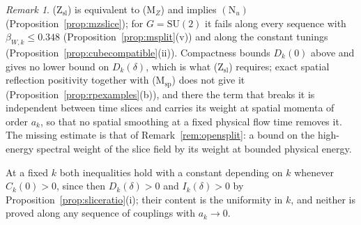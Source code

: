 \documentclass[aps,prd,twocolumn,superscriptaddress,nofootinbib,longbibliography,floatfix,amsmath,amssymb,10pt]{revtex4-2}
\theoremstyle{definition}
\theoremstyle{remark}
\newtheorem{remark}[theorem]{Remark}
\newcommand{\SU}{\mathrm{SU}}
\begin{document}
\begin{remark}
(Z$_{\mathrm{sl}}$) is equivalent to (M$_Z$) and implies $(\mathrm N_u)$
(Proposition~\ref{prop:mzslice}); for $G=\SU(2)$ it fails along every
sequence with $\beta_{W,k}\le0.348$ (Proposition~\ref{prop:msplit}(v)) and
along the constant tunings (Proposition~\ref{prop:cubecompatible}(ii)). Compactness bounds $D_k(0)$ above and gives no
lower bound on $D_k(\delta)$, which is what (Z$_{\mathrm{sl}}$) requires;
exact spatial reflection positivity together with (M$_{\mathrm{sp}}$) does
not give it (Proposition~\ref{prop:rpexamples}(b)), and there the term
that breaks it is independent between time slices and carries its weight at spatial momenta of order $a_k$, so that no spatial smoothing at a fixed physical flow time removes
it. The
missing estimate is that of Remark~\ref{rem:opensplit}: a bound on the
high-energy spectral weight of the slice field by its weight at bounded
physical energy.

At a fixed $k$ both inequalities hold with a constant depending on $k$
whenever $C_k(0)>0$, since then $D_k(\delta)>0$ and $I_k(\delta)>0$ by
Proposition~\ref{prop:sliceratio}(i); their content is the uniformity in
$k$, and neither is proved along any sequence of couplings with
$a_k\to0$.
\end{remark}
\end{document}
